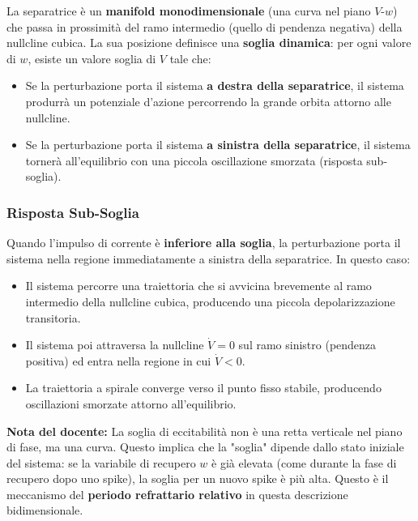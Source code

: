 La separatrice è un \textbf{manifold monodimensionale} (una curva nel piano $V$-$w$) che passa in prossimità del ramo intermedio (quello di pendenza negativa) della nullcline cubica. La sua posizione definisce una \textbf{soglia dinamica}: per ogni valore di $w$, esiste un valore soglia di $V$ tale che:
\begin{itemize}
    \item Se la perturbazione porta il sistema \textbf{a destra della separatrice}, il sistema produrrà un potenziale d'azione percorrendo la grande orbita attorno alle nullcline.
    \item Se la perturbazione porta il sistema \textbf{a sinistra della separatrice}, il sistema tornerà all'equilibrio con una piccola oscillazione smorzata (risposta sub-soglia).
\end{itemize}

\subsubsection{Risposta Sub-Soglia}

Quando l'impulso di corrente è \textbf{inferiore alla soglia}, la perturbazione porta il sistema nella regione immediatamente a sinistra della separatrice. In questo caso:
\begin{itemize}
    \item Il sistema percorre una traiettoria che si avvicina brevemente al ramo intermedio della nullcline cubica, producendo una piccola depolarizzazione transitoria.
    \item Il sistema poi attraversa la nullcline $\dot{V} = 0$ sul ramo sinistro (pendenza positiva) ed entra nella regione in cui $\dot{V} < 0$.
    \item La traiettoria a spirale converge verso il punto fisso stabile, producendo oscillazioni smorzate attorno all'equilibrio.
\end{itemize}

\begin{tcolorbox}[colback=gray!5, colframe=gray!40, arc=2mm, boxrule=0.5pt]
\textbf{Nota del docente:} La soglia di eccitabilità non è una retta verticale nel piano di fase, ma una curva. Questo implica che la "soglia" dipende dallo stato iniziale del sistema: se la variabile di recupero $w$ è già elevata (come durante la fase di recupero dopo uno spike), la soglia per un nuovo spike è più alta. Questo è il meccanismo del \textbf{periodo refrattario relativo} in questa descrizione bidimensionale.
\end{tcolorbox}



